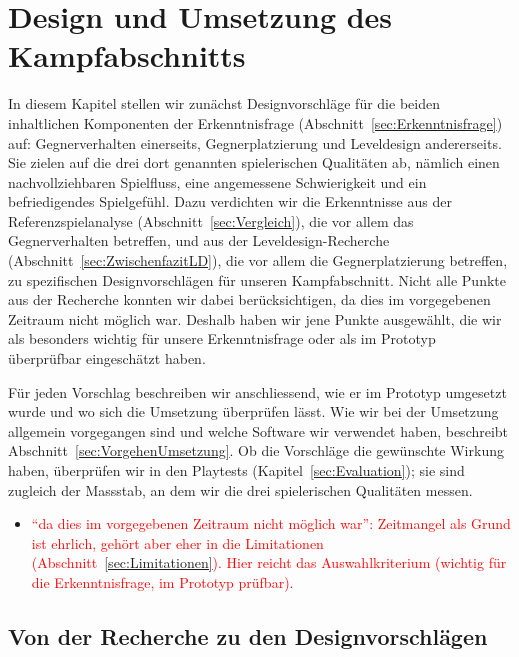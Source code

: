 \documentclass[../Main.tex]{subfiles}
\begin{document}
\section{Design und Umsetzung des Kampfabschnitts} \label{sec:Umsetzung}

In diesem Kapitel stellen wir zunächst Designvorschläge für die beiden inhaltlichen Komponenten der Erkenntnisfrage (Abschnitt~\ref{sec:Erkenntnisfrage}) auf: Gegnerverhalten einerseits, Gegnerplatzierung und Leveldesign andererseits. Sie zielen auf die drei dort genannten spielerischen Qualitäten ab, nämlich einen nachvollziehbaren Spielfluss, eine angemessene Schwierigkeit und ein befriedigendes Spielgefühl. Dazu verdichten wir die Erkenntnisse aus der Referenzspielanalyse (Abschnitt~\ref{sec:Vergleich}), die vor allem das Gegnerverhalten betreffen, und aus der Leveldesign-Recherche (Abschnitt~\ref{sec:ZwischenfazitLD}), die vor allem die Gegnerplatzierung betreffen, zu spezifischen Designvorschlägen für unseren Kampfabschnitt. Nicht alle Punkte aus der Recherche konnten wir dabei berücksichtigen, da dies im vorgegebenen Zeitraum nicht möglich war. Deshalb haben wir jene Punkte ausgewählt, die wir als besonders wichtig für unsere Erkenntnisfrage oder als im Prototyp überprüfbar eingeschätzt haben.

Für jeden Vorschlag beschreiben wir anschliessend, wie er im Prototyp umgesetzt wurde und wo sich die Umsetzung überprüfen lässt. Wie wir bei der Umsetzung allgemein vorgegangen sind und welche Software wir verwendet haben, beschreibt Abschnitt~\ref{sec:VorgehenUmsetzung}. Ob die Vorschläge die gewünschte Wirkung haben, überprüfen wir in den Playtests (Kapitel~\ref{sec:Evaluation}); sie sind zugleich der Massstab, an dem wir die drei spielerischen Qualitäten messen.

\begin{itemize}[leftmargin=1.5cm]
    \item \textcolor{red}{\enquote{da dies im vorgegebenen Zeitraum nicht möglich war}: Zeitmangel als Grund ist ehrlich, gehört aber eher in die Limitationen (Abschnitt~\ref{sec:Limitationen}). Hier reicht das Auswahlkriterium (wichtig für die Erkenntnisfrage, im Prototyp prüfbar).}
\end{itemize}

\subsection{Von der Recherche zu den Designvorschlägen} \label{sec:Designvorschlaege}
\end{document}
